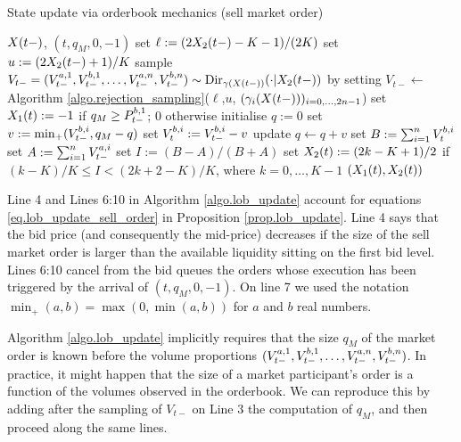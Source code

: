 \documentclass[10pt]{article}
\begin{document}
\begin{algorithm}[h]
 \caption{State update via orderbook mechanics (sell market order)}
 \label{algo.lob_update}
 \begin{algorithmic}[5]
  \REQUIRE $\stateVariable(t-)$, $(t,q_M, 0, -1)$
  \STATE set $\ell := (2\stateVariable_2(t-) - K - 1)/(2K)$
  \STATE set $u:= (2\stateVariable_2(t-) +1)/K$
  \STATE sample $V_{t-} = (\nthBestAskVolume[1]_{t-},\nthBestBidVolume[1]_{t-},\dots,\nthBestAskVolume[n]_{t-},\nthBestBidVolume[n]_{t-}) \sim \text{Dir}_{\dirichletParam(\stateVariable(t-))}(\cdot \vert \stateVariable_2 (t-) )$ by setting $V_{t-} \leftarrow $ Algorithm \ref{algo.rejection_sampling}($\ell$,$u$, $(\dirparam_i(\stateVariable(t-)))_{i=0,\dots,2n-1}$)
  \STATE set $\stateVariable_1(t) := -1$ if $q_M \geq \nthBestBidPrice[1]_{t-}$; $0$ otherwise
  \STATE initialise $q:=0$
  \STATE set $v:= \min_{+} (\nthBestBidVolume[i]_{t-}, q_M - q )$
  \STATE set $\nthBestBidVolume[i]_{t} := \nthBestBidVolume[i]_{t-} - v$
  \STATE update $q\leftarrow q+v$
  \ENDFOR
  \STATE set $B:= \sum_{i=1}^{n} \nthBestBidVolume[i]_t$
  \STATE set $A:= \sum_{i=1}^{n} \nthBestAskVolume[i]_{t-}$
  \STATE set $I:= (B-A)/(B+A)$ 
  \STATE set $\stateVariable_2(t):= (2k-K+1)/2$ if $(k-K)/K \leq I < (2k+2 -K)/K$, where $k=0,\dots,K-1$
  \RETURN $(\stateVariable_1(t),\stateVariable_2(t))$
 \end{algorithmic}
\end{algorithm}

Line 4 and Lines 6:10 in Algorithm \ref{algo.lob_update} account for equations \eqref{eq.lob_update_sell_order} in Proposition \ref{prop.lob_update}. Line 4 says that the bid price (and consequently the mid-price) decreases if the size of the sell market order is larger than the available liquidity sitting on the first bid level. Lines 6:10 cancel from the bid queues the orders whose execution has been triggered by the arrival of $(t,q_M,0,-1)$.  On line 7 we used the notation $\min_{+}(a,b) = \max(0,\min(a,b))$ for $a$ and $b$ real numbers. 

\begin{remark}\label{remark.order_size_after_volume_sampling}
 Algorithm \ref{algo.lob_update} implicitly requires that the size $q_M$ of the market order is known before the volume proportions $(\nthBestAskVolume[1]_{t-},\nthBestBidVolume[1]_{t-},\dots,\nthBestAskVolume[n]_{t-},\nthBestBidVolume[n]_{t-})$. In practice, it might happen that the size of a market participant's order is a function of the volumes observed in the orderbook. We can reproduce this by adding after the sampling of $V_{t-}$ on Line 3 the computation of $q_M$, and then proceed along the same lines.
\end{remark}
\end{document}
